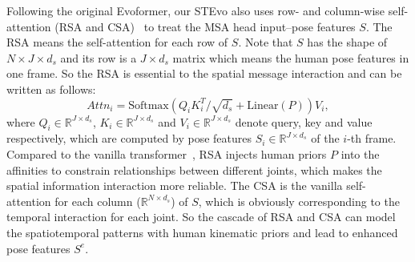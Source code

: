 \documentclass{article}
\begin{document}
 Following the original Evoformer, our STEvo also uses row- and column-wise self-attention (RSA and CSA)~\cite{jumper2021highly} to treat the MSA head input--pose features $S$. The RSA means the self-attention for each row of $S$. Note that $S$ has the shape of $N\times J\times d_s$ and its row is a $J\times d_s$ matrix which means the human pose features in one frame. So the RSA is essential to the spatial message interaction and can be written as follows:
\setlength\abovedisplayskip{0.1em}
\setlength\belowdisplayskip{0.1em}
\begin{equation}
    Attn_i = \text{Softmax}(Q_iK_i^T/\sqrt{d_s}+\text{Linear}(P))V_i,\label{attention}
\end{equation}
where $Q_i\in\mathbb R^{J\times d_s}$, $K_i\in\mathbb R^{J\times d_s}$ and $V_i\in\mathbb R^{J\times d_s}$ denote query, key and value~\cite{vaswani2017attention} respectively, which are computed by pose features $S_i\in\mathbb R^{J\times d_s}$ of the $i$-th frame. Compared to the vanilla transformer~\cite{vaswani2017attention}, RSA injects human priors $P$ into the affinities to constrain relationships between different joints, which makes the spatial information interaction more reliable. The CSA is the vanilla self-attention for each column ($\mathbb R^{N\times d_s}$) of $S$, which is obviously corresponding to the temporal interaction for each joint. So the cascade of RSA and CSA can model the spatiotemporal patterns with human kinematic priors and lead to enhanced pose features $S^e$.
\end{document}
